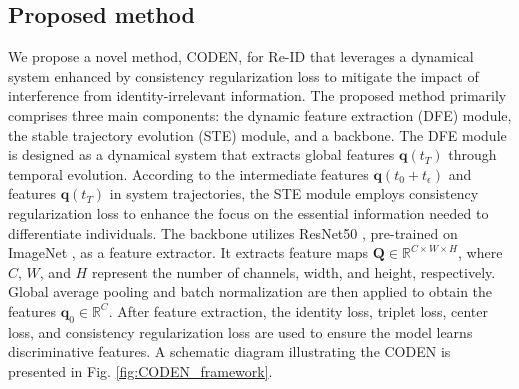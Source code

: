 \documentclass[12pt]{spieman}  %
\begin{document}
\begin{spacing}{2}
\section{Proposed method} \label{section:proposed_method}
We propose a novel method, CODEN, for Re-ID that leverages a dynamical system enhanced by consistency regularization loss to mitigate the impact of interference from identity-irrelevant information. The proposed method primarily comprises three main components: the dynamic feature extraction (DFE) module, the stable trajectory evolution (STE) module, and a backbone. The DFE module is designed as a dynamical system that extracts global features $\boldsymbol{q}(t_T)$ through temporal evolution. According to the intermediate features $\boldsymbol{q}(t_0 + t_\epsilon)$ and features $\boldsymbol{q}(t_T)$ in system trajectories, the STE module employs consistency regularization loss to enhance the focus on the essential information needed to differentiate individuals. The backbone utilizes ResNet50 \cite{he2016deep}, pre-trained on ImageNet \cite{russakovsky2015imagenet}, as a feature extractor. It extracts feature maps $\boldsymbol{Q} \in \mathbb{R}^{C \times W \times H}$, where $C$, $W$, and $H$ represent the number of channels, width, and height, respectively. Global average pooling and batch normalization are then applied to obtain the features $\boldsymbol{q}_0 \in \mathbb{R}^C$. After feature extraction, the identity loss, triplet loss, center loss, and consistency regularization loss are used to ensure the model learns discriminative features. A schematic diagram illustrating the CODEN is presented in Fig. \ref{fig:CODEN_framework}.


\end{spacing}
\end{document}
